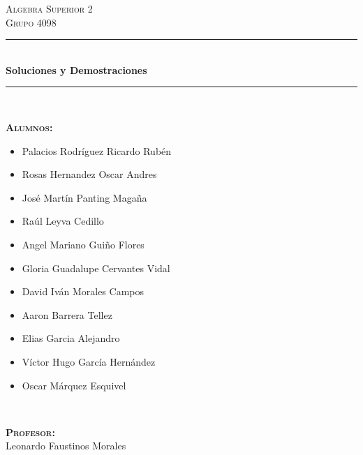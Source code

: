 \documentclass[12pt, fleqn]{article}                             %
\author{Oscar Andrés Rosas}                                     %
\begin{document}
\begin{titlepage}

    \center
    \textsc{\Large Algebra Superior 2}\\[0.5cm] 
    \textsc{\large Grupo 4098}\\[1.0cm]

    \rule{\linewidth}{0.5mm} \\[1.0cm]
        { \huge \bfseries Soluciones y Demostraciones}\\[1.0cm] 
    \rule{\linewidth}{0.5mm} \\[1.5cm]
     
    \begin{minipage}{0.55\textwidth}
        \begin{flushleft}
            \footnotesize{
            \textbf{\textsc{Alumnos:}}\\
                \begin{itemize}
                    \item Palacios Rodríguez Ricardo Rubén
                    \item Rosas Hernandez Oscar Andres
                    \item José Martín Panting Magaña
                    \item Raúl Leyva Cedillo
                    \item Angel Mariano Guiño Flores
                    \item Gloria Guadalupe Cervantes Vidal
                    \item David Iván Morales Campos
                    \item Aaron Barrera Tellez
                    \item Elias Garcia Alejandro
                    \item Víctor Hugo García Hernández
                    \item Oscar Márquez Esquivel
                \end{itemize}
            }
        \end{flushleft}
    \end{minipage}
    ~
    \begin{minipage}{0.4\textwidth}
        \begin{flushright} \footnotesize
            \textbf{\textsc{Profesor: }}\\
            Leonardo Faustinos Morales
            

\end{flushright}
\end{minipage}
\end{titlepage}
\end{document}
